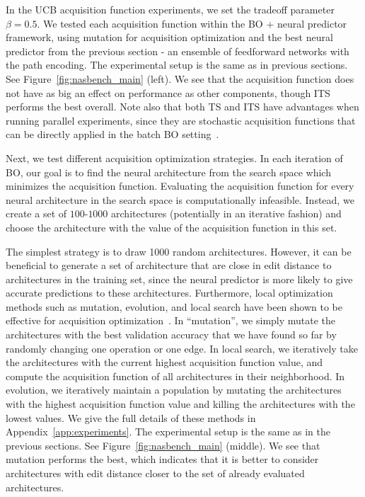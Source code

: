 \documentclass[11pt]{article}
\numberwithin{equation}{section}
\numberwithin{figure}{section}
\theoremstyle{plain}
\theoremstyle{definition}
\let\citep\cite
\begin{document}
In the UCB acquisition function experiments, we set the tradeoff parameter $\beta=0.5$.
We tested each acquisition function within the BO + neural predictor framework,
using mutation for acquisition optimization and
the best neural predictor from the previous section - an ensemble of
feedforward networks with the path encoding. 
The experimental setup is the same as in previous sections.
See Figure~\ref{fig:nasbench_main} (left).
We see that the acquisition function does not have as big an effect on performance
as other components, though ITS performs the best overall.
Note also that both TS and ITS have advantages when running parallel
experiments, since they are stochastic acquisition functions that can be directly
applied in the batch BO setting~\cite{kandasamy2018parallelised}.


Next, we test different acquisition optimization strategies.
In each iteration of BO, our goal is to find the neural architecture from the search 
space which minimizes the acquisition function.
Evaluating the acquisition function for every neural architecture
in the search space is computationally infeasible.
Instead, we create a set of $100$-$1000$ architectures
(potentially in an iterative fashion) and choose the architecture with
the value of the acquisition function in this set.

The simplest strategy is to draw 1000 random architectures.
However, it can be beneficial to generate a set of architecture that are close in
edit distance to architectures in the training set, since the neural predictor is
more likely to give accurate predictions to these architectures.
Furthermore, local optimization methods such as mutation, evolution, and local
search have been shown to be effective for acquisition 
optimization~\citep{balandat2019botorch, nasbot, wilson2018maximizing}.
In ``mutation'', we simply mutate the architectures
with the best validation accuracy that we have found so far by randomly changing
one operation or one edge.
In local search, we iteratively take the architectures with the current highest
acquisition function value, and compute the acquisition function of all 
architectures in their neighborhood.
In evolution, we iteratively maintain a population by mutating the architectures
with the highest acquisition function value and killing the architectures with the
lowest values.
We give the full details of these methods in 
Appendix~\ref{app:experiments}.
The experimental setup is the same as in the previous sections.
See Figure~\ref{fig:nasbench_main} (middle).  
We see that mutation performs the best, which indicates that it is better to consider
architectures with edit distance closer to the set of already evaluated architectures.
\end{document}
